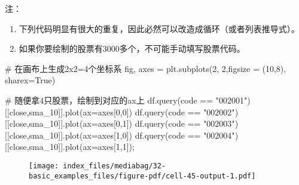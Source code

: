 \documentclass[
  letterpaper,
  DIV=11,
  numbers=noendperiod]{scrreprt}
\newenvironment{Shaded}{\begin{snugshade}}{\end{snugshade}}
\newcommand{\CommentTok}[1]{\textcolor[rgb]{0.37,0.37,0.37}{#1}}
\newcommand{\DecValTok}[1]{\textcolor[rgb]{0.68,0.00,0.00}{#1}}
\newcommand{\NormalTok}[1]{\textcolor[rgb]{0.00,0.23,0.31}{#1}}
\newcommand{\OperatorTok}[1]{\textcolor[rgb]{0.37,0.37,0.37}{#1}}
\newcommand{\StringTok}[1]{\textcolor[rgb]{0.13,0.47,0.30}{#1}}
\newcommand{\VariableTok}[1]{\textcolor[rgb]{0.07,0.07,0.07}{#1}}
\providecommand{\tightlist}{%
  \setlength{\itemsep}{0pt}\setlength{\parskip}{0pt}}\usepackage{longtable,booktabs,array}
\begin{document}
注：

\begin{enumerate}
\def\labelenumi{\arabic{enumi}.}
\tightlist
\item
  下列代码明显有很大的重复，因此必然可以改造成循环（或者列表推导式）。
\item
  如果你要绘制的股票有3000多个，不可能手动填写股票代码。
\end{enumerate}

\begin{Shaded}
\begin{Highlighting}[]
\CommentTok{\# 在画布上生成2x2=4个坐标系}
\NormalTok{fig, axes }\OperatorTok{=}\NormalTok{ plt.subplots(}\DecValTok{2}\NormalTok{, }\DecValTok{2}\NormalTok{,figsize }\OperatorTok{=}\NormalTok{ (}\DecValTok{10}\NormalTok{,}\DecValTok{8}\NormalTok{), sharex}\OperatorTok{=}\VariableTok{True}\NormalTok{)}

\CommentTok{\# 随便拿4只股票，绘制到对应的ax上}
\NormalTok{df.query(}\StringTok{\textquotesingle{}code == "002001"\textquotesingle{}}\NormalTok{)[[}\StringTok{\textquotesingle{}close\textquotesingle{}}\NormalTok{,}\StringTok{\textquotesingle{}sma\_10\textquotesingle{}}\NormalTok{]].plot(ax}\OperatorTok{=}\NormalTok{axes[}\DecValTok{0}\NormalTok{,}\DecValTok{0}\NormalTok{])}
\NormalTok{df.query(}\StringTok{\textquotesingle{}code == "002002"\textquotesingle{}}\NormalTok{)[[}\StringTok{\textquotesingle{}close\textquotesingle{}}\NormalTok{,}\StringTok{\textquotesingle{}sma\_10\textquotesingle{}}\NormalTok{]].plot(ax}\OperatorTok{=}\NormalTok{axes[}\DecValTok{0}\NormalTok{,}\DecValTok{1}\NormalTok{])}
\NormalTok{df.query(}\StringTok{\textquotesingle{}code == "002003"\textquotesingle{}}\NormalTok{)[[}\StringTok{\textquotesingle{}close\textquotesingle{}}\NormalTok{,}\StringTok{\textquotesingle{}sma\_10\textquotesingle{}}\NormalTok{]].plot(ax}\OperatorTok{=}\NormalTok{axes[}\DecValTok{1}\NormalTok{,}\DecValTok{0}\NormalTok{])}
\NormalTok{df.query(}\StringTok{\textquotesingle{}code == "002004"\textquotesingle{}}\NormalTok{)[[}\StringTok{\textquotesingle{}close\textquotesingle{}}\NormalTok{,}\StringTok{\textquotesingle{}sma\_10\textquotesingle{}}\NormalTok{]].plot(ax}\OperatorTok{=}\NormalTok{axes[}\DecValTok{1}\NormalTok{,}\DecValTok{1}\NormalTok{])}\OperatorTok{;}
\end{Highlighting}
\end{Shaded}

\begin{figure}[H]

{\centering \texttt{[image: index\_files/mediabag/32-basic\_examples\_files/figure-pdf/cell-45-output-1.pdf]}

}

\end{figure}
\end{document}
